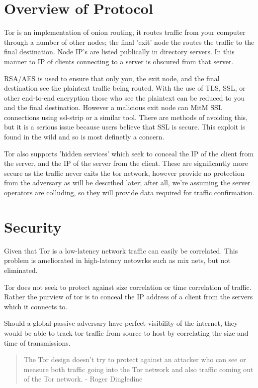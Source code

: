 \section{Overview of Protocol}
Tor is an implementation of onion routing, it routes traffic from your computer
through a number of other nodes; the final 'exit' node the routes the traffic
to the final destination. Node IP's are listed publically in directory servers.
In this manner to IP of clients connecting to a server is obscured from that
server.

RSA/AES is used to ensure that only you, the exit node, and the final
destination see the plaintext traffic being routed. With the use of TLS, SSL, or
other end-to-end encryption those who see the plaintext can be reduced to you
and the final destination. However a malicious exit node can MitM SSL connections
using ssl-strip or a similar tool. There are methods of avoiding this, but it is
a serious issue because users believe that SSL is secure. This exploit is found
in the wild\cite{badRelays} and so is most definetly a concern.

Tor also supports 'hidden services' which seek to conceal the IP of the client
from the server, and the IP of the server from the client. These are
significantly more secure as the traffic never exits the tor network, however
provide no protection from the adversary as will be described later; after all,
we're assuming the server operators are colluding, so they will provide data
required for traffic confirmation.

\section{Security}
Given that Tor is a low-latency network traffic can easily be correlated. This
problem is ameliorated in high-latency netowrks such as mix nets, but not
eliminated.

Tor does not seek to protect against size correlation or time correlation of
traffic. Rather the purview of tor is to conceal the IP address of a client from
the servers which it connects to.

Should a global passive adversary have perfect visibility of the internet, they
would be able to track tor traffic from source to host by correlating the size
and time of transmissions.

\begin{quote}
The Tor design doesn't try to protect against an attacker who can see or measure
both traffic going into the Tor network and also traffic coming out of the Tor
network\cite{torOneCell}. - Roger Dingledine
\end{quote}

